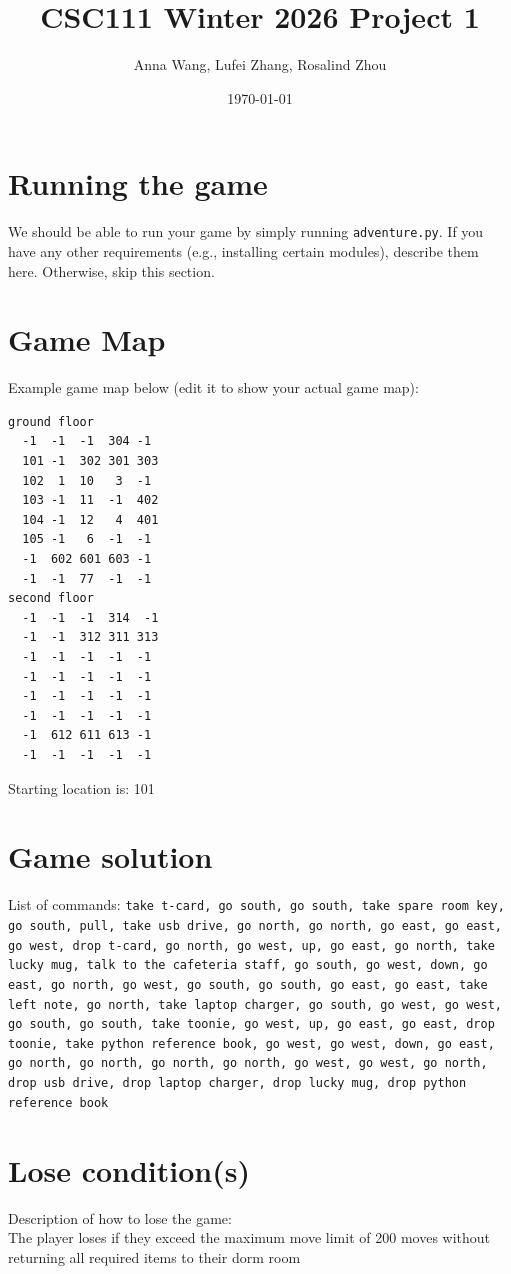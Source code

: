 \documentclass[11pt]{article}
\title{CSC111 Winter 2026 Project 1}
\author{Anna Wang, Lufei Zhang, Rosalind Zhou}
\date{\today}
\begin{document}
\maketitle

\section*{Running the game}
We should be able to run your game by simply running \texttt{adventure.py}. If you have any other requirements (e.g., installing certain modules), describe them here. Otherwise, skip this section.

\section*{Game Map}
Example game map below (edit it to show your actual game map):

\begin{verbatim}
ground floor
  -1  -1  -1  304 -1
  101 -1  302 301 303
  102  1  10   3  -1
  103 -1  11  -1  402
  104 -1  12   4  401
  105 -1   6  -1  -1
  -1  602 601 603 -1
  -1  -1  77  -1  -1
second floor
  -1  -1  -1  314  -1
  -1  -1  312 311 313
  -1  -1  -1  -1  -1
  -1  -1  -1  -1  -1
  -1  -1  -1  -1  -1
  -1  -1  -1  -1  -1
  -1  612 611 613 -1
  -1  -1  -1  -1  -1

\end{verbatim}

Starting location is: 101

\section*{Game solution}
List of commands:
\texttt{take t-card, go south, go south, take spare room key, go south, pull, take usb drive, go north, go north, go east, go east, go west, drop t-card, go north, go west, up, go east, go north, take lucky mug, talk to the cafeteria staff, go south, go west, down, go east, go north, go west, go south, go south, go east, go east, take left note, go north, take laptop charger, go south, go west, go west, go south, go south, take toonie, go west, up, go east, go east, drop toonie, take python reference book, go west, go west, down, go east, go north, go north, go north, go north, go west, go west, go north, drop usb drive, drop laptop charger, drop lucky mug, drop python reference book}\\



\section*{Lose condition(s)}
Description of how to lose the game: \\
The player loses if they exceed the maximum move limit of 200 moves without returning all required items to their dorm room\\
\end{document}
